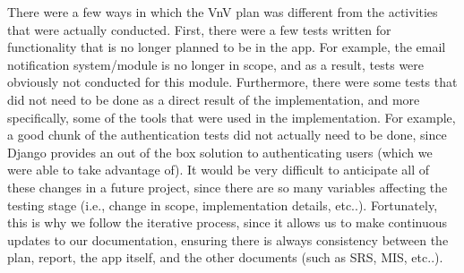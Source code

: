 \documentclass[12pt, titlepage]{article}
\begin{document}
There were a few ways in which the VnV plan was different from the activities that were actually conducted. First, there were a few tests written 
for functionality that is no longer planned to be in the app. For example, the email notification system/module is no longer in scope, and as a result,
tests were obviously not conducted for this module. Furthermore, there were some tests that did not need to be done as a direct result of the 
implementation, and more specifically, some of the tools that were used in the implementation. For example, a good chunk of the authentication tests did 
not actually need to be done, since Django provides an out of the box solution to authenticating users (which we were able to take advantage of). It would be 
very difficult to anticipate all of these changes in a future project, since there are so many variables affecting the testing stage (i.e., change in scope,
implementation details, etc..). Fortunately, this is why we follow the iterative process, since it allows us to make continuous updates to our documentation,
ensuring there is always consistency between the plan, report, the app itself, and the other documents (such as SRS, MIS, etc..).
\end{document}
